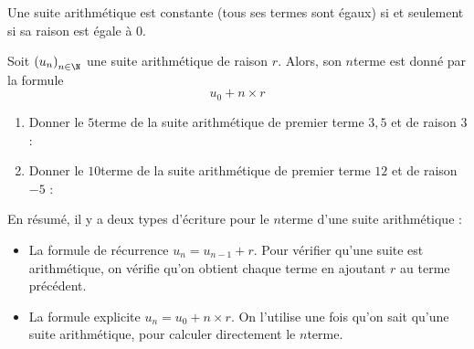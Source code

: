 \documentclass{article}
\begin{document}
\begin{remark}
Une suite arithmétique est constante (tous ses termes sont égaux) si et seulement si sa raison est égale à $0$.
\end{remark}
\begin{proposition}
Soit $\left(u_n\right)_{n \in \N}$ une suite arithmétique de raison $r$. Alors, son $n$\ieme terme est donné par la formule
\begin{equation*}
u_0 + n \times r
\end{equation*}
\end{proposition}
\begin{example}
\hfill
\begin{enumerate}[label=\emph{\alph*)}]
\item Donner le $5$\ieme terme de la suite arithmétique de premier terme $3,5$ et de raison $3$ : \answersline
\item Donner le $10$\ieme terme de la suite arithmétique de premier terme $12$ et de raison $-5$ : \answersline 
\end{enumerate}
\end{example}
\begin{tcolorbox}
En résumé, il y a deux types d'écriture pour le $n$\ieme terme d'une suite arithmétique :
\begin{itemize}
\item La formule de récurrence $u_n = u_{n - 1} + r$. Pour vérifier qu'une suite est arithmétique, on vérifie qu'on obtient chaque terme en ajoutant $r$ au terme précédent.
\item La formule explicite $u_n = u_0 + n \times r$. On l'utilise une fois qu'on sait qu'une suite arithmétique, pour calculer directement le $n$\ieme terme.
\end{itemize} 
\end{tcolorbox}
\end{document}
